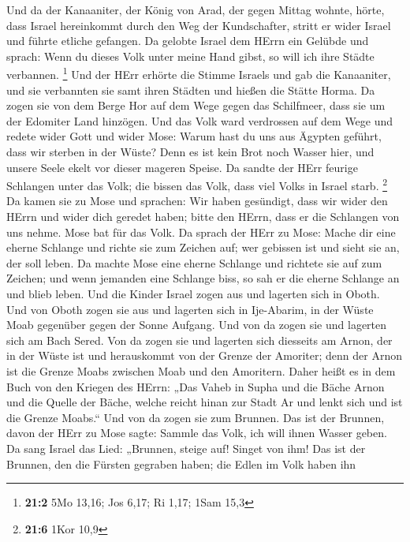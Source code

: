  Und da der Kanaaniter, der König von Arad, der gegen
Mittag wohnte, hörte, dass Israel hereinkommt durch den Weg der
Kundschafter, stritt er wider Israel und führte etliche gefangen.
 Da gelobte Israel dem HErrn ein Gelübde und sprach: Wenn
du dieses Volk unter meine Hand gibst, so will ich ihre Städte
verbannen. \footnote{\textbf{21:2} 5Mo 13,16; Jos 6,17; Ri 1,17; 1Sam
  15,3}  Und der HErr erhörte die Stimme Israels und gab
die Kanaaniter, und sie verbannten sie samt ihren Städten und hießen die
Stätte Horma.  Da zogen sie von dem Berge Hor auf dem Wege
gegen das Schilfmeer, dass sie um der Edomiter Land hinzögen. Und das
Volk ward verdrossen auf dem Wege  und redete wider Gott
und wider Mose: Warum hast du uns aus Ägypten geführt, dass wir sterben
in der Wüste? Denn es ist kein Brot noch Wasser hier, und unsere Seele
ekelt vor dieser mageren Speise.  Da sandte der HErr
feurige Schlangen unter das Volk; die bissen das Volk, dass viel Volks
in Israel starb. \footnote{\textbf{21:6} 1Kor 10,9}  Da
kamen sie zu Mose und sprachen: Wir haben gesündigt, dass wir wider den
HErrn und wider dich geredet haben; bitte den HErrn, dass er die
Schlangen von uns nehme. Mose bat für das Volk.  Da sprach
der HErr zu Mose: Mache dir eine eherne Schlange und richte sie zum
Zeichen auf; wer gebissen ist und sieht sie an, der soll leben.
 Da machte Mose eine eherne Schlange und richtete sie auf
zum Zeichen; und wenn jemanden eine Schlange biss, so sah er die eherne
Schlange an und blieb leben.  Und die Kinder Israel zogen
aus und lagerten sich in Oboth.  Und von Oboth zogen sie
aus und lagerten sich in Ije-Abarim, in der Wüste Moab gegenüber gegen
der Sonne Aufgang.  Und von da zogen sie und lagerten
sich am Bach Sered.  Von da zogen sie und lagerten sich
diesseits am Arnon, der in der Wüste ist und herauskommt von der Grenze
der Amoriter; denn der Arnon ist die Grenze Moabs zwischen Moab und den
Amoritern.  Daher heißt es in dem Buch von den Kriegen
des HErrn: „Das Vaheb in Supha und die Bäche Arnon  und
die Quelle der Bäche, welche reicht hinan zur Stadt Ar und lenkt sich
und ist die Grenze Moabs.``  Und von da zogen sie zum
Brunnen. Das ist der Brunnen, davon der HErr zu Mose sagte: Sammle das
Volk, ich will ihnen Wasser geben.  Da sang Israel das
Lied: „Brunnen, steige auf! Singet von ihm!  Das ist der
Brunnen, den die Fürsten gegraben haben; die Edlen im Volk haben ihn
